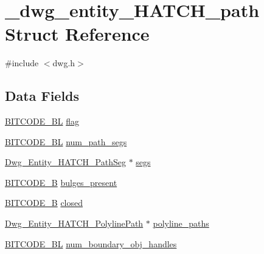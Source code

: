 \hypertarget{struct__dwg__entity__HATCH__path}{\section{\-\_\-dwg\-\_\-entity\-\_\-\-H\-A\-T\-C\-H\-\_\-path \-Struct \-Reference}
\label{struct__dwg__entity__HATCH__path}
}


{\ttfamily \#include $<$dwg.\-h$>$}

\subsection*{\-Data \-Fields}
\begin{DoxyCompactItemize}
\item 
\hyperlink{dwg_8h_aebd5f127038868cbabc3d55d91da776c}{\-B\-I\-T\-C\-O\-D\-E\-\_\-\-B\-L} \hyperlink{struct__dwg__entity__HATCH__path_a6e6a03bc1c0be20c5b5a30ce664c6602}{flag}
\item 
\hyperlink{dwg_8h_aebd5f127038868cbabc3d55d91da776c}{\-B\-I\-T\-C\-O\-D\-E\-\_\-\-B\-L} \hyperlink{struct__dwg__entity__HATCH__path_a243f2b06633ac98083063cb52e684c0d}{num\-\_\-path\-\_\-segs}
\item 
\hyperlink{dwg_8h_a7dc324d94128f2c96e1655a0e00ac98a}{\-Dwg\-\_\-\-Entity\-\_\-\-H\-A\-T\-C\-H\-\_\-\-Path\-Seg} $\ast$ \hyperlink{struct__dwg__entity__HATCH__path_aa8cd264a762b9617a73f4c2d0a9b31f3}{segs}
\item 
\hyperlink{dwg_8h_ab533b1f62d9086749e3bb5b67e9f224e}{\-B\-I\-T\-C\-O\-D\-E\-\_\-\-B} \hyperlink{struct__dwg__entity__HATCH__path_a12c6d425a97304fca63312e5fb2aaef6}{bulges\-\_\-present}
\item 
\hyperlink{dwg_8h_ab533b1f62d9086749e3bb5b67e9f224e}{\-B\-I\-T\-C\-O\-D\-E\-\_\-\-B} \hyperlink{struct__dwg__entity__HATCH__path_ac13a0f127466f0d9d9b646c46ddffc73}{closed}
\item 
\hyperlink{dwg_8h_a3ad26f732736e898cd55c4fdb3a73998}{\-Dwg\-\_\-\-Entity\-\_\-\-H\-A\-T\-C\-H\-\_\-\-Polyline\-Path} $\ast$ \hyperlink{struct__dwg__entity__HATCH__path_af754cd019639d5d3bd3a4f8bb20761e8}{polyline\-\_\-paths}
\item 
\hyperlink{dwg_8h_aebd5f127038868cbabc3d55d91da776c}{\-B\-I\-T\-C\-O\-D\-E\-\_\-\-B\-L} \hyperlink{struct__dwg__entity__HATCH__path_af3949f2518d7846b239def5743afe9e0}{num\-\_\-boundary\-\_\-obj\-\_\-handles}
\end{DoxyCompactItemize}


